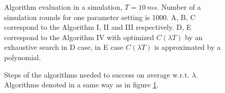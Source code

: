 \documentclass[twoside]{article}
\begin{document}
\begin{multicols}{2}
\begin{figure}[H]
{}
\caption{Algorithm evaluation in a simulation, $T=10~ms$. Number of a simulation rounds for one parameter setting is 1000.
 A, B, C correspond to the Algorithm I, II and III respectively.
 D, E correspond to the Algorithm IV with optimized $C(\lambda T)$ by an exhaustive search in D case, 
 in E case $C(\lambda T)$ is approximated by a polynomial.}
\label{fig:alg_eval}
\end{figure}
    
\begin{figure}[H]
{}
\caption{Steps of the algorithms needed to success on average w.r.t. $\lambda$. Algorithms denoted in a same way as in figure \ref{fig:alg_eval}.}
\label{fig:alg_steps}
\end{figure}


\end{multicols}
\end{document}
